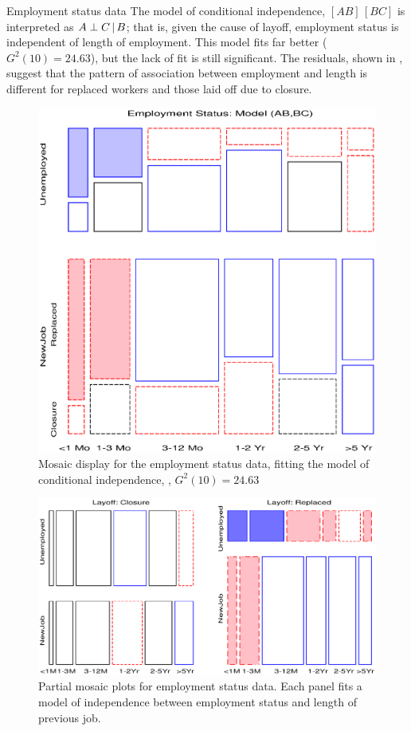 \begin{Example}[employ]{Employment status data}
The model of conditional independence, \([AB] \,  [BC] \)
is interpreted as \(A \perp C \, | \, B\);
that is, given the cause of layoff, employment status is independent of length of employment.
This model fits far better (\(G^2 (10) = 24.63\)),
but the lack of fit is still significant.
The residuals, shown in ,
suggest that the pattern of association between employment and length
is different for replaced workers and those laid off due to closure.

\begin{figure}[htb]
  \centering
  \includegraphics[scale=.6]{ch4/fig/mosaic143}
  \caption[Employment status data, conditional independence]{Mosaic display for the employment status data, fitting the model of
conditional independence, , \(G^2 (10) = 24.63\)}
  \label{fig:mosaic143} 
\end{figure}

\begin{figure}[htb]
  \centering
  \includegraphics[width=\linewidth,clip]{ch4/fig/employp}
  \caption[Partial mosaic plots for employment status data]{Partial mosaic plots for employment status data. Each panel fits a model of independence
  between employment status and length of previous job.}
  \label{fig:employp}
\end{figure}


\end{Example}
